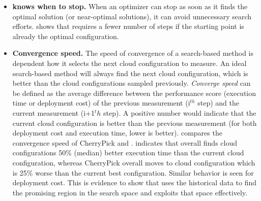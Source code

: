 \begin{itemize}
\item \textbf{\scout knows when to stop.}
When an optimizer can stop as soon as it finds the optimal solution (or near-optimal solutions),
it can avoid unnecessary search efforts. \myfigure{\ref{fig:single_startingpoint}} shows that \scout requires a fewer number of steps if the starting point is already the optimal configuration.

\item \textbf{Convergence speed.}
The speed of convergence of a search-based method is dependent how it selects the next cloud configuration to measure. An ideal search-based method will always find the next cloud configuration, which is better than the cloud configurations sampled previously. \textit{Converge speed} can be defined as the average difference between the performance score (execution time or deployment cost) of the previous measurement (i$^{th}$ step) and the current measurement (i+1$^th$ step). A positive number would indicate that the current cloud configuration is better than the previous measurement (for both deployment cost and execution time, lower is better). \myfigure{\ref{fig:search_convergence}} compares the convergence speed of CherryPick and \scout. \myfigure{\ref{fig:search_convergence}} indicates that \scout overall finds cloud configurations 50\% (median) better execution time than the current cloud configuration, whereas CherryPick overall moves to cloud configuration which is 25\% worse than the current best configuration. Similar behavior is seen for deployment cost. This is evidence to show that \scout uses the historical data to find the promising region in the search space and exploits that space effectively.

\end{itemize}



